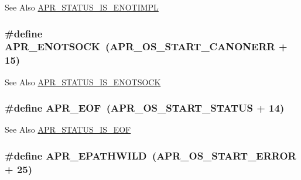 \begin{DoxySeeAlso}{See Also}
\hyperlink{group___a_p_r___s_t_a_t_u_s___i_s_gacab882e24f5d6491777e8ef7763d02fb}{A\-P\-R\-\_\-\-S\-T\-A\-T\-U\-S\-\_\-\-I\-S\-\_\-\-E\-N\-O\-T\-I\-M\-P\-L} 
\end{DoxySeeAlso}
\hypertarget{group___a_p_r___error_gad456312527050c661dc19a8f17a0f0ef}{
\subsubsection[{A\-P\-R\-\_\-\-E\-N\-O\-T\-S\-O\-C\-K}]{\setlength{\rightskip}{0pt plus 5cm}\#define A\-P\-R\-\_\-\-E\-N\-O\-T\-S\-O\-C\-K~({\bf A\-P\-R\-\_\-\-O\-S\-\_\-\-S\-T\-A\-R\-T\-\_\-\-C\-A\-N\-O\-N\-E\-R\-R} + 15)}}\label{group___a_p_r___error_gad456312527050c661dc19a8f17a0f0ef}
\begin{DoxySeeAlso}{See Also}
\hyperlink{group___a_p_r___s_t_a_t_u_s___i_s_ga7b7807755d3d6f24e9978337b9faa5a1}{A\-P\-R\-\_\-\-S\-T\-A\-T\-U\-S\-\_\-\-I\-S\-\_\-\-E\-N\-O\-T\-S\-O\-C\-K} 
\end{DoxySeeAlso}
\hypertarget{group___a_p_r___error_ga35d9dca2514c522a2840aca0f3e2ebd3}{
\subsubsection[{A\-P\-R\-\_\-\-E\-O\-F}]{\setlength{\rightskip}{0pt plus 5cm}\#define A\-P\-R\-\_\-\-E\-O\-F~({\bf A\-P\-R\-\_\-\-O\-S\-\_\-\-S\-T\-A\-R\-T\-\_\-\-S\-T\-A\-T\-U\-S} + 14)}}\label{group___a_p_r___error_ga35d9dca2514c522a2840aca0f3e2ebd3}
\begin{DoxySeeAlso}{See Also}
\hyperlink{group___a_p_r___s_t_a_t_u_s___i_s_gaf4232cd96b47b76aec9607b1a78e694f}{A\-P\-R\-\_\-\-S\-T\-A\-T\-U\-S\-\_\-\-I\-S\-\_\-\-E\-O\-F} 
\end{DoxySeeAlso}
\hypertarget{group___a_p_r___error_ga01d0fb965051103b5c8f15a43ad2c767}{
\subsubsection[{A\-P\-R\-\_\-\-E\-P\-A\-T\-H\-W\-I\-L\-D}]{\setlength{\rightskip}{0pt plus 5cm}\#define A\-P\-R\-\_\-\-E\-P\-A\-T\-H\-W\-I\-L\-D~({\bf A\-P\-R\-\_\-\-O\-S\-\_\-\-S\-T\-A\-R\-T\-\_\-\-E\-R\-R\-O\-R} + 25)}}\label{group___a_p_r___error_ga01d0fb965051103b5c8f15a43ad2c767}
